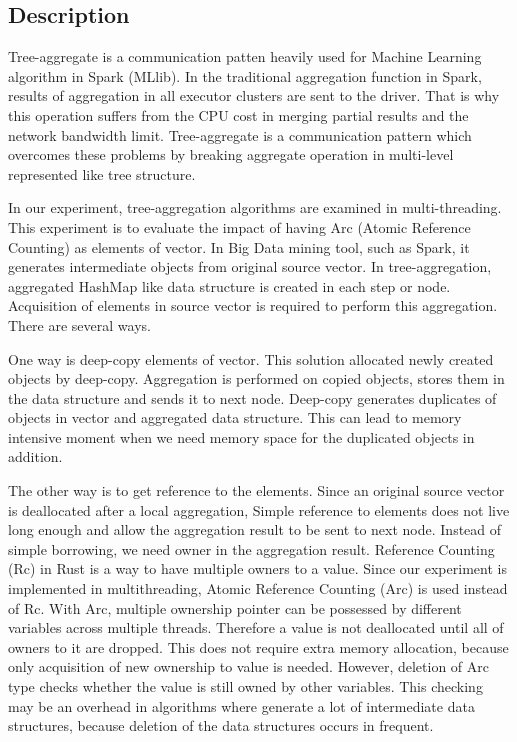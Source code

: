 \subsection{Description}
Tree-aggregate is a communication patten heavily used for Machine Learning algorithm in Spark (MLlib). 
In the traditional aggregation function in Spark, results of aggregation in all executor clusters are sent to the driver. 
That is why this operation suffers from the CPU cost in merging partial results and the network bandwidth limit.
Tree-aggregate is a communication pattern which overcomes these problems by breaking aggregate operation in multi-level represented like tree structure.

In our experiment, tree-aggregation algorithms are examined in multi-threading. This experiment is to evaluate the impact of having Arc (Atomic Reference Counting) as elements of vector. 
In Big Data mining tool, such as Spark, it generates intermediate objects from original source vector. In tree-aggregation, aggregated HashMap like data structure is created in each step or node. 
Acquisition of elements in source vector is required to perform this aggregation. There are several ways.

One way is deep-copy elements of vector. This solution allocated newly created objects by deep-copy. 
Aggregation is performed on copied objects, stores them in the data structure and sends it to next node. 
Deep-copy generates duplicates of objects in vector and aggregated data structure. 
This can lead to memory intensive moment when we need memory space for the duplicated objects in addition.

The other way is to get reference to the elements. Since an original source vector is deallocated after a local aggregation,
Simple reference to elements does not live long enough and allow the aggregation result to be sent to next node. 
Instead of simple borrowing, we need owner in the aggregation result. Reference Counting (Rc) in Rust is a way to have multiple owners to a value. 
Since our experiment is implemented in multithreading, Atomic Reference Counting (Arc) is used instead of Rc. With Arc, multiple ownership pointer can be 
possessed by different variables across multiple threads. Therefore a value is not deallocated until all of owners to it are dropped. 
This does not require extra memory allocation, because only acquisition of new ownership to value is needed. 
However, deletion of Arc type checks whether the value is still owned by other variables. 
This checking may be an overhead in algorithms where generate a lot of intermediate data structures, because deletion of the data structures occurs in frequent.

